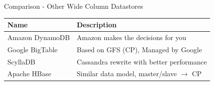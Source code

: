\documentclass[
  10pt
]{beamer}
\begin{document}
\appendix

\begin{frame}{Comparison - Other Wide Column Datastores}
  \begin{center}
    \begin{tabular}{l|l}
      Name & Description \\
      \hline
      Amazon DynamoDB & Amazon makes the decisions for you \\
      Google BigTable & Based on GFS (CP), Managed by Google \\
      ScyllaDB & Cassandra rewrite with better performance \\
      Apache HBase & Similar data model, master/slave $\rightarrow$ CP\\
    \end{tabular}
  \end{center}
\end{frame}

\begin{frame}[allowframebreaks]
    \printbibliography
\end{frame}
\end{document}
